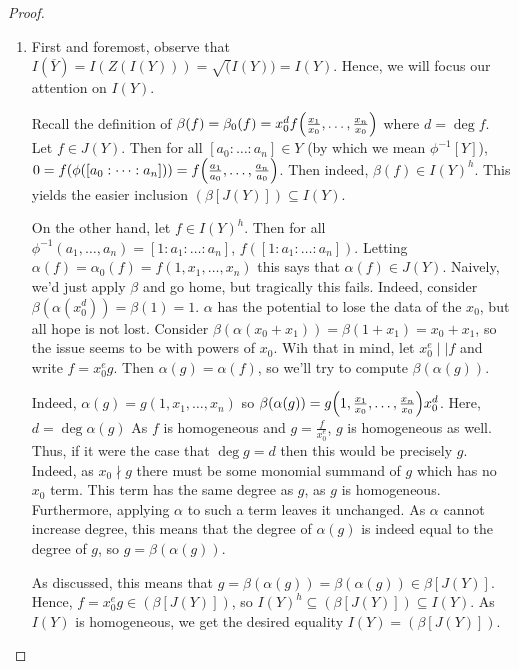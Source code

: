 \begin{proof}
    \begin{enumerate}[label= (\alph*)]
        \item First and foremost, observe that $I(\overline Y) = I(Z(I(Y))) = \sqrt(I(Y)) = I(Y)$. Hence, we will focus our attention on $I(Y)$.
        
        Recall the definition of $\beta(f) = \beta_0(f) = x_0^d f{\left(\frac{x_1}{x_0}, \dots, \frac{x_n}{x_0}\right)}$ where $d = \deg f$. Let $f \in J(Y)$. Then for all $[a_0 : \dots : a_n] \in Y$ (by which we mean $\phi^{-1}[Y]$), $0=f(\phi([a_0 : \dots : a_n])) = f{\left(\frac{a_1}{a_0}, \dots, \frac{a_n}{a_0}\right)}$. Then indeed, $\beta(f) \in I(Y)^h$. This yields the easier inclusion $(\beta[J(Y)]) \subseteq I(Y)$.

        On the other hand, let $f \in I(Y)^h$. Then for all $\phi^{-1}(a_1, \dots, a_n) = [1 : a_1 : \dots : a_n]$, $f([1 : a_1 : \dots : a_n])$. Letting $\alpha(f) = \alpha_0(f) = f(1, x_1, \dots, x_n)$ this says that $\alpha(f) \in J(Y)$. Naively, we'd just apply $\beta$ and go home, but tragically this fails. Indeed, consider $\beta(\alpha(x_0^d)) = \beta(1) = 1$. $\alpha$ has the potential to lose the data of the $x_0$, but all hope is not lost. Consider $\beta(\alpha(x_0 + x_1)) = \beta(1 + x_1) = x_0 + x_1$, so the issue seems to be with powers of $x_0$. Wih that in mind, let $x_0^e \mid\mid f$ and write $f = x_0^e g$. Then $\alpha(g) = \alpha(f)$, so we'll try to compute $\beta(\alpha(g))$.

        Indeed, $\alpha(g) = g(1, x_1, \dots, x_n)$ so $\beta(\alpha(g)) = g{\left(1, \frac{x_1}{x_0}, \dots, \frac{x_n}{x_0}\right)} x_0^d$. Here, $d = \deg \alpha(g)$ As $f$ is homogeneous and $g = \frac{f}{x_0^e}$, $g$ is homogeneous as well. Thus, if it were the case that $\deg g = d$ then this would be precisely $g$. Indeed, as $x_0 \nmid g$ there must be some monomial summand of $g$ which has no $x_0$ term. This term has the same degree as $g$, as $g$ is homogeneous. Furthermore, applying $\alpha$ to such a term leaves it unchanged. As $\alpha$ cannot increase degree, this means that the degree of $\alpha(g)$ is indeed equal to the degree of $g$, so $g = \beta(\alpha(g))$.

        As discussed, this means that $g = \beta(\alpha(g)) = \beta(\alpha(g)) \in \beta[J(Y)]$. Hence, $f = x_0^e g \in (\beta[J(Y)])$, so $I(Y)^h \subseteq (\beta[J(Y)]) \subseteq I(Y)$. As $I(Y)$ is homogeneous, we get the desired equality $I(Y) = (\beta[J(Y)])$.


\end{enumerate}
\end{proof}

